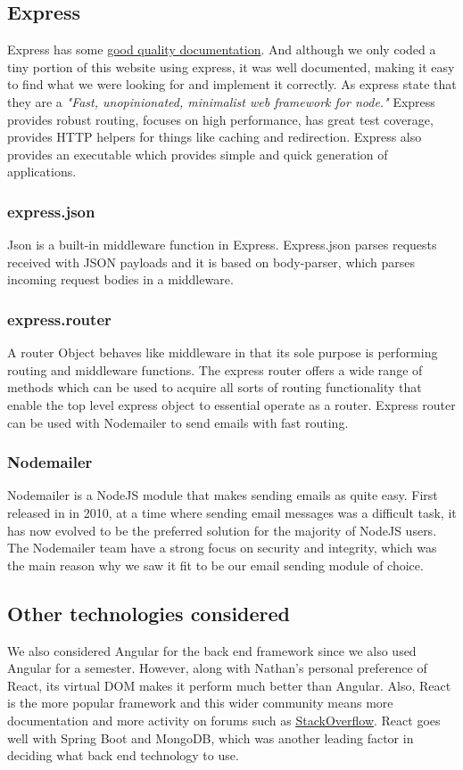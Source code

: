 \subsection{Express}
Express has some \href{https://expressjs.com/en/5x/api.html}{good quality documentation}. And although we only coded a tiny portion of this website using express, it was well documented, making it easy to find what we were looking for and implement it correctly. As express state that they are a \cite{ExpressRM}\emph{"Fast, unopinionated, minimalist web framework for node."} Express provides robust routing, focuses on high performance, has great test coverage, provides HTTP helpers for things like caching and redirection. Express also provides an executable which provides simple and quick generation of applications. 

\subsubsection{express.json} 
Json is a built-in middleware function in Express. Express.json parses requests received with JSON payloads and it is based on body-parser, which parses incoming request bodies in a middleware. 

\subsubsection{express.router}
A router Object behaves like middleware in that its sole purpose is performing routing and middleware functions. The express router offers a wide range of methods which can be used to acquire all sorts of routing functionality that enable the top level express object to essential operate as a router. Express router can be used with Nodemailer to send emails with fast routing.

\subsubsection{Nodemailer}
Nodemailer is a NodeJS module that makes sending emails as quite easy. First released in in 2010, at a time where sending email messages was a difficult task, it has now evolved to be the preferred solution for the majority of NodeJS users.
The Nodemailer team have a strong focus on security and integrity, which was the main reason why we saw it fit to be our email sending module of choice.

\subsection{Other technologies considered}
We also considered Angular for the back end framework since we also used Angular for a semester. However, along with Nathan's personal preference of React, its virtual DOM makes it perform much better than Angular. Also, React is the more popular framework and this wider community means more documentation and more activity on forums such as \underline{\href{https://stackoverflow.com}{StackOverflow}}. React goes well with Spring Boot and MongoDB, which was another leading factor in deciding what back end technology to use.  \newline

